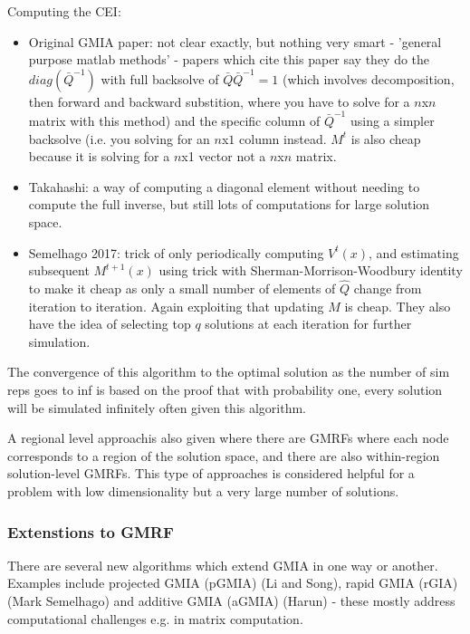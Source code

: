 \documentclass{article}
\begin{document}
Computing the CEI:
\begin{itemize}
\item Original GMIA paper: not clear exactly, but nothing very smart - 'general purpose matlab methods' - papers which cite this paper say they do the $diag(\bar{Q}^{-1})$ with full backsolve of $\bar{Q}\bar{Q}^{-1}=1$ (which involves decomposition, then forward and backward substition, where you have to solve for a $n$x$n$ matrix with this method) and the specific column of $\bar{Q}^{-1}$ using a simpler backsolve (i.e. you solving for an $n$x$1$ column instead. $M^{t}$ is also cheap because it is solving for a $n$x1 vector not a $n$x$n$ matrix. 
\item Takahashi: a way of computing a diagonal element without needing to compute the full inverse, but still lots of computations for large solution space.
  \item Semelhago 2017: trick of only periodically computing $V^{t}(x)$, and estimating subsequent $M^{t+1}(x)$ using trick with Sherman-Morrison-Woodbury identity to make it cheap as only a small number of elements of $\hat{Q}$ change from iteration to iteration. Again exploiting that updating $M$ is cheap. They also have the idea of selecting top $q$ solutions at each iteration for further simulation. 
\end{itemize}

The convergence of this algorithm to the optimal solution as the number of sim reps goes to inf is based on the proof that with probability one, every solution will be simulated infinitely often given this algorithm.  \newline

A regional level approachis also given where there are GMRFs where each node corresponds to a region of the solution space, and there are also within-region solution-level GMRFs. This type of approaches is considered helpful for a problem with low dimensionality but a very large number of solutions. \newline

\subsubsection{Extenstions to GMRF}

There are several new algorithms which extend GMIA in one way or another. Examples include projected GMIA (pGMIA) (Li and Song), rapid GMIA (rGIA) (Mark Semelhago) and additive GMIA (aGMIA) (Harun) - these mostly address computational challenges e.g. in matrix computation. \newline
\end{document}
